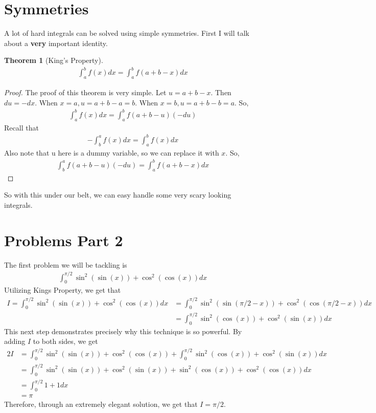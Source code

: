 \documentclass[12pt]{article}
\newtheorem{theorem}{Theorem}[section]
\theoremstyle{definition}
\theoremstyle{remark}
\begin{document}
    \section{Symmetries}
    A lot of hard integrals can be solved using simple symmetries. 
    First I will talk about a \textbf{very} important identity.

    \begin{theorem}[King's Property]
        \begin{align*}
            \int_{a}^{b} f(x)dx = \int_{a}^{b} f(a+b-x)dx
        \end{align*}
    \end{theorem}

    \begin{proof}
        The proof of this theorem is very simple.
        Let $u = a + b - x$. Then $du = -dx$.
        When $x = a, u = a + b - a = b$.
        When $x = b, u = a + b - b = a$. So,
        \begin{align*}
            \int_{a}^{b} f(x)dx = \int_{a}^{b} f(a+b-u)(-du)
        \end{align*}
        Recall that 
        \begin{align*}
        -\int_{b}^{a} f(x)dx = \int_{a}^{b} f(x)dx     
        \end{align*}
        Also note that u here is a dummy variable, so we can replace it with $x$.
        So,
        \begin{align*}
            \int_{b}^{a}f(a+b-u)(-du) = \int_{a}^{b} f(a+b-x)dx
        \end{align*}
    \end{proof}
    So with this under our belt, we can easy handle some very scary looking integrals.

    \section{Problems Part 2}
    The first problem we will be tackling is 
    \begin{align*}
        \int_{0}^{\pi/2} \sin^2(\sin(x)) + \cos^2(\cos(x))dx
    \end{align*}
    Utilizing Kings Property, we get that 
    \begin{align*}
        I = \int_{0}^{\pi/2} \sin^2(\sin(x))+\cos^2(\cos(x))dx &= \int_{0}^{\pi/2} \sin^2(\sin(\pi/2 - x)) + \cos^2(\cos(\pi/2 - x))dx \\ 
        &= \int_{0}^{\pi/2} \sin^2(\cos(x)) + \cos^2(\sin(x))dx
    \end{align*}
    This next step demonstrates precisely why this technique is so powerful.
    By adding $I$ to both sides, we get 
    \begin{align*}
        2I &= \int_{0}^{\pi/2} \sin^2(\sin(x)) + \cos^2(\cos(x)) + \int_{0}^{\pi/2} \sin^2(\cos(x)) + \cos^2(\sin(x))dx \\ 
        &= \int_{0}^{\pi/2} \sin^2(\sin(x)) + \cos^2(\sin(x)) + \sin^2(\cos(x)) + \cos^2(\cos(x))dx \\ 
        &= \int_{0}^{\pi/2} 1 + 1dx \\ 
        &= \pi
    \end{align*}
    Therefore, through an extremely elegant solution, we get that $I = \pi/2$.
\end{document}
